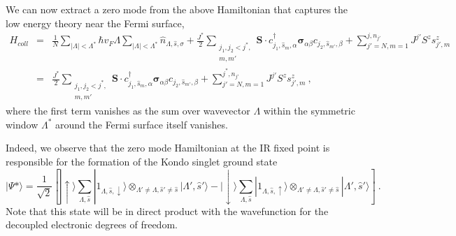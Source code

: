 \documentclass[aps,prl,preprint,groupedaddress]{revtex4-2}
\begin{document}
\par\noindent
We can now extract a zero mode from the above Hamiltonian that captures the low energy theory near the Fermi surface,
\begin{eqnarray}
H_{coll}&=&\frac{1}{N}\sum_{|\Lambda|<\Lambda^{*}}\hbar v_{F}\Lambda\sum_{|\Lambda|<\Lambda^{*}}\hat{n}_{\Lambda,\hat{s},\sigma}+\frac{J^{*}}{2}\sum_{\substack{j_{1},j_{2}<j^{*},\\ m,m'}}\mathbf{S}\cdot c^{\dagger}_{j_{1},\hat{s}_{m},\alpha}\boldsymbol{\sigma}_{\alpha\beta}c_{j_{2},\hat{s}_{m'},\beta}+\sum_{j'=N,m=1}^{j,n_{j'}}J^{j'}S^{z}s^{z}_{j',m}\nonumber\\
		&=&\frac{J^{*}}{2}\sum_{\substack{j_{1},j_{2}<j^{*},\\ m,m'}}\mathbf{S}\cdot c^{\dagger}_{j_{1},\hat{s}_{m},\alpha}\boldsymbol{\sigma}_{\alpha\beta}c_{j_{2},\hat{s}_{m'},\beta}+\sum_{j'=N,m=1}^{j^{*},n_{j'}}J^{j'}S^{z}s^{z}_{j',m}~,
\end{eqnarray}
where the first term vanishes as the sum over wavevector $\Lambda$ within the symmetric window $\Lambda^{*}$ around the Fermi surface itself vanishes.
\par\noindent 
Indeed, we observe that the zero mode Hamiltonian at the IR fixed point is responsible for the formation of the Kondo singlet ground state
\begin{equation}
|\Psi*\rangle=\frac{1}{\sqrt{2}}\left[|\uparrow\rangle\sum_{\Lambda,\hat{s}}|1_{\Lambda,\hat{s},\downarrow}\rangle\otimes_{\Lambda'\neq\Lambda,\hat{s}'\neq \hat{s}}|\Lambda',\hat{s}'\rangle-|\downarrow\rangle\sum_{\Lambda,\hat{s}}|1_{\Lambda,\hat{s},\uparrow}\rangle\otimes_{\Lambda'\neq\Lambda,\hat{s}'\neq \hat{s}}|\Lambda',\hat{s}'\rangle\right]~.
\end{equation}
Note that this state will be in direct product with the wavefunction for the decoupled electronic degrees of freedom.
\end{document}
